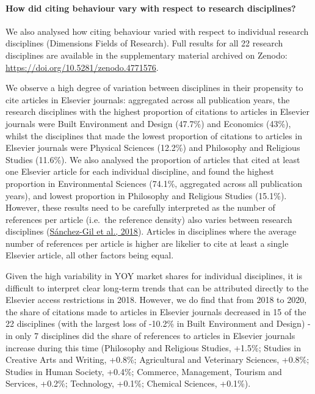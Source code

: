 \documentclass[
]{article}
\begin{document}
\hypertarget{how-did-citing-behaviour-vary-with-respect-to-research-disciplines}{%
\paragraph{How did citing behaviour vary with respect to research disciplines?}\label{how-did-citing-behaviour-vary-with-respect-to-research-disciplines}}

We also analysed how citing behaviour varied with respect to individual research disciplines (Dimensions Fields of Research). Full results for all 22 research disciplines are available in the supplementary material archived on Zenodo: \url{https://doi.org/10.5281/zenodo.4771576}.

We observe a high degree of variation between disciplines in their propensity to cite articles in Elsevier journals: aggregated across all publication years, the research disciplines with the highest proportion of citations to articles in Elsevier journals were Built Environment and Design (47.7\%) and Economics (43\%), whilst the disciplines that made the lowest proportion of citations to articles in Elsevier journals were Physical Sciences (12.2\%) and Philosophy and Religious Studies (11.6\%). We also analysed the proportion of articles that cited at least one Elsevier article for each individual discipline, and found the highest proportion in Environmental Sciences (74.1\%, aggregated across all publication years), and lowest proportion in Philosophy and Religious Studies (15.1\%). However, these results need to be carefully interpreted as the number of references per article (i.e.~the reference density) also varies between research disciplines (\href{https://doi.org/10.1016/j.joi.2017.11.003}{Sánchez-Gil et al., 2018}). Articles in disciplines where the average number of references per article is higher are likelier to cite at least a single Elsevier article, all other factors being equal.

Given the high variability in YOY market shares for individual disciplines, it is difficult to interpret clear long-term trends that can be attributed directly to the Elsevier access restrictions in 2018. However, we do find that from 2018 to 2020, the share of citations made to articles in Elsevier journals decreased in 15 of the 22 disciplines (with the largest loss of -10.2\% in Built Environment and Design) - in only 7 disciplines did the share of references to articles in Elsevier journals increase during this time (Philosophy and Religious Studies, +1.5\%; Studies in Creative Arts and Writing, +0.8\%; Agricultural and Veterinary Sciences, +0.8\%; Studies in Human Society, +0.4\%; Commerce, Management, Tourism and Services, +0.2\%; Technology, +0.1\%; Chemical Sciences, +0.1\%).
\end{document}
